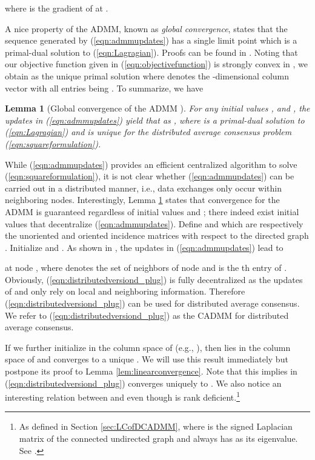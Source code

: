 \documentclass[journal]{IEEEtran}
\newtheorem{lemma}{Lemma}
\begin{document}
where  is the gradient of  at . 

A nice property of the ADMM, known as \emph{global convergence}, states that the sequence  generated by (\ref{eqn:admmupdates}) has a single limit point   which is a primal-dual solution to (\ref{eqn:Lagragian}). Proofs can be found in \cite{BoydADMM,Deng2016,He2012}. Noting that our objective function  given in (\ref{eqn:objectivefunction}) is strongly convex in , we obtain  as the unique primal solution where  denotes the -dimensional column vector with all entries being . To summarize, we have
\begin{lemma}[Global convergence of the ADMM \cite{BoydADMM,Deng2016,He2012}]
\label{lem:globalconvergence}
For any initial values ,  and , the updates in (\ref{eqn:admmupdates}) yield that as , 
where  is a primal-dual solution to (\ref{eqn:Lagragian}) and  is unique for the distributed average consensus problem (\ref{eqn:squareformulation}).
\end{lemma}

While (\ref{eqn:admmupdates}) provides an efficient centralized algorithm to solve (\ref{eqn:squareformulation}), it is not clear whether (\ref{eqn:admmupdates}) can be carried out in a distributed manner, i.e., data exchanges only occur within neighboring nodes. Interestingly, Lemma \ref{lem:globalconvergence} states that convergence for the ADMM is guaranteed regardless of initial values  and ; there indeed exist initial values that decentralize (\ref{eqn:admmupdates}). Define  and  which are respectively the unoriented and oriented incidence matrices with respect to the directed graph . Initialize  and . As shown in \cite{Shi2014}, the updates in (\ref{eqn:admmupdates}) lead to 
 
at node , where  denotes the set of neighbors of node  and  is the th entry of . Obviously, (\ref{eqn:distributedversiond_plug}) is fully decentralized as the updates of  and  only rely on local and neighboring information. Therefore (\ref{eqn:distributedversiond_plug}) can be used for distributed average consensus. We refer to (\ref{eqn:distributedversiond_plug}) as the CADMM for distributed average consensus.

If we further initialize  in the column space of  (e.g., ), then  lies in the column space of  and converges to a unique . We will use this result immediately but postpone its proof to Lemma \ref{lem:linearconvergence}. Note that this implies  in (\ref{eqn:distributedversiond_plug}) converges uniquely to . We also notice an interesting relation between  and  even though  is rank deficient.\footnote{As defined in Section \ref{sec:LCofDCADMM},  where  is the signed Laplacian matrix of the connected undirected graph and always has  as its eigenvalue. See \cite{ChungSpectral}.}
 
\end{document}
